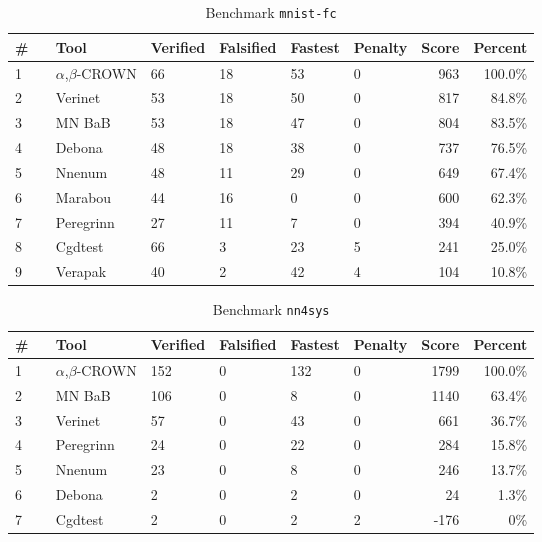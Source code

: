 
\begin{table}[h]
\begin{center}
\caption{Benchmark \texttt{mnist-fc}} \label{tab:cat_{cat}}
{\setlength{\tabcolsep}{2pt}
\begin{tabular}[h]{@{}llllllrr@{}}
\toprule
\textbf{\# ~} & \textbf{Tool} & \textbf{Verified} & \textbf{Falsified} & \textbf{Fastest} & \textbf{Penalty} & \textbf{Score} & \textbf{Percent}\\
\midrule
1 & $\alpha$,$\beta$-CROWN & 66 & 18 & 53 & 0 & 963 & 100.0\% \\
2 & Verinet & 53 & 18 & 50 & 0 & 817 & 84.8\% \\
3 & MN BaB & 53 & 18 & 47 & 0 & 804 & 83.5\% \\
4 & Debona & 48 & 18 & 38 & 0 & 737 & 76.5\% \\
5 & Nnenum & 48 & 11 & 29 & 0 & 649 & 67.4\% \\
6 & Marabou & 44 & 16 & 0 & 0 & 600 & 62.3\% \\
7 & Peregrinn & 27 & 11 & 7 & 0 & 394 & 40.9\% \\
8 & Cgdtest & 66 & 3 & 23 & 5 & 241 & 25.0\% \\
9 & Verapak & 40 & 2 & 42 & 4 & 104 & 10.8\% \\
\bottomrule
\end{tabular}
}
\end{center}
\end{table}




\begin{table}[h]
\begin{center}
\caption{Benchmark \texttt{nn4sys}} \label{tab:cat_{cat}}
{\setlength{\tabcolsep}{2pt}
\begin{tabular}[h]{@{}llllllrr@{}}
\toprule
\textbf{\# ~} & \textbf{Tool} & \textbf{Verified} & \textbf{Falsified} & \textbf{Fastest} & \textbf{Penalty} & \textbf{Score} & \textbf{Percent}\\
\midrule
1 & $\alpha$,$\beta$-CROWN & 152 & 0 & 132 & 0 & 1799 & 100.0\% \\
2 & MN BaB & 106 & 0 & 8 & 0 & 1140 & 63.4\% \\
3 & Verinet & 57 & 0 & 43 & 0 & 661 & 36.7\% \\
4 & Peregrinn & 24 & 0 & 22 & 0 & 284 & 15.8\% \\
5 & Nnenum & 23 & 0 & 8 & 0 & 246 & 13.7\% \\
6 & Debona & 2 & 0 & 2 & 0 & 24 & 1.3\% \\
7 & Cgdtest & 2 & 0 & 2 & 2 & -176 & 0\% \\
\bottomrule
\end{tabular}
}
\end{center}
\end{table}



